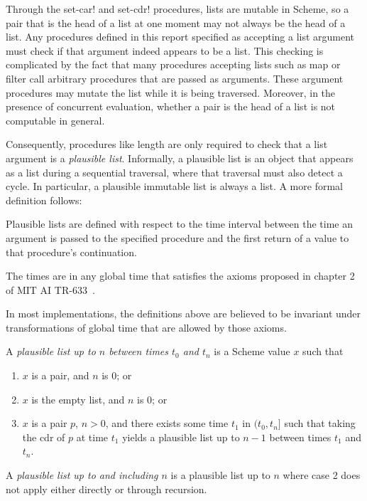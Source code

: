 Through the {\cf set-car!} and {\cf set-cdr!} procedures, lists are
mutable in Scheme, so a pair that is the head of a list at one moment
may not always be the head of a list.  Any procedures defined in this
report specified as accepting a list argument must check if that
argument indeed appears to be a list.  This checking is complicated by
the fact that many procedures accepting lists such as {\cf map} or
{\cf filter} call arbitrary procedures that are passed as arguments.
These argument procedures may mutate the list while it is being
traversed.  Moreover, in the presence of concurrent evaluation,
whether a pair is the head of a list is not computable in general.

Consequently, procedures like {\cf length} are only required to check
that a list argument is a \textit{plausible list}.  Informally, a plausible list is an object that appears as
a list during a sequential traversal, where that traversal must also
detect a cycle.  In particular, a plausible immutable list is always a list.
A more formal definition follows:

Plausible lists are defined with respect to the time interval between
the time an argument is passed to the specified procedure and the
first return of a value to that procedure's continuation.

The times are in any global time that satisfies the axioms proposed in
chapter 2 of MIT AI TR-633~\cite{AITR633}.

\begin{note}
In most implementations,
the definitions above are believed to be invariant under
transformations of global time that are allowed by those axioms.
\end{note}

A \textit{plausible list up to $n$ between times $t_0$ and $t_n$} is a
Scheme value $x$ such that
%
\begin{enumerate}
\item $x$ is a pair, and $n$ is $0$; or
\item $x$ is the empty list, and $n$ is $0$; or
\item $x$ is a pair $p$, $n > 0$, and there exists some time
  $t_1$ in $(t_0,t_n]$ such that taking the cdr of $p$ at
  time $t_1$ yields a plausible list up to $n-1$ between
  times $t_1$ and $t_n$.
\end{enumerate}

A \textit{plausible list up to and including $n$} is a plausible list
up to $n$ where case 2 does not apply either directly or through
recursion.

